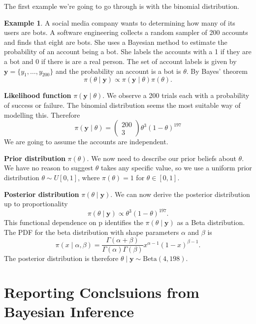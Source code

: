 \documentclass[
]{book}
\theoremstyle{definition}
\theoremstyle{definition}
\newtheorem{example}{Example}[chapter]
\theoremstyle{definition}
\theoremstyle{definition}
\theoremstyle{remark}
\begin{document}
The first example we're going to go through is with the binomial distribution.

\begin{example}
\protect\hypertarget{exm:binom}{}\label{exm:binom}A social media company wants to determining how many of its users are bots. A software engineering collects a random sampler of 200 accounts and finds that eight are bots. She uses a Bayesian method to estimate the probability of an account being a bot. She labels the accounts with a 1 if they are a bot and 0 if there is are a real person. The set of account labels is given by \(\boldsymbol{y} = \{y_1, \ldots, y_{200}\}\) and the probability an account is a bot is \(\theta\). By Bayes' theorem
\[
\pi(\theta \mid \boldsymbol{y}) \propto \pi(\boldsymbol{y}\mid \theta) \pi(\theta).
\]

\textbf{Likelihood function} \(\pi(\boldsymbol{y}\mid \theta)\). We observe a 200 trials each with a probability of success or failure. The binomial distribution seems the most suitable way of modelling this. Therefore
\[
\pi(\boldsymbol{y}\mid \theta) = \begin{pmatrix} 200 \\ 3 \end{pmatrix} \theta^3(1-\theta)^{197}
\]
We are going to assume the accounts are independent.

\textbf{Prior distribution} \(\pi(\theta)\). We now need to describe our prior beliefs about \(\theta\). We have no reason to suggest \(\theta\) takes any specific value, so we use a uniform prior distribution \(\theta \sim U[0, 1]\), where \(\pi(\theta) = 1\) for \(\theta \in [0, 1]\).

\textbf{Posterior distribution} \(\pi(\theta \mid \boldsymbol{y})\). We can now derive the posterior distribution up to proportionality
\[
\pi(\theta \mid \boldsymbol{y}) \propto \theta^3(1-\theta)^{197}. 
\]
This functional dependence on p identifies the \(\pi(\theta \mid \boldsymbol{y})\) as a Beta distribution. The PDF for the beta distribution with shape parameters \(\alpha\) and \(\beta\) is
\[
\pi(x \mid \alpha, \beta) = \frac{\Gamma(\alpha + \beta)}{\Gamma(\alpha)\Gamma(\beta)}x^{\alpha - 1}(1-x)^{\beta - 1}. 
\]
The posterior distribution is therefore \(\theta \mid \boldsymbol{y} \sim \textrm{Beta}(4, 198)\).
\end{example}

\hypertarget{reporting-conclsuions-from-bayesian-inference}{%
\section{Reporting Conclsuions from Bayesian Inference}\label{reporting-conclsuions-from-bayesian-inference}}
\end{document}
